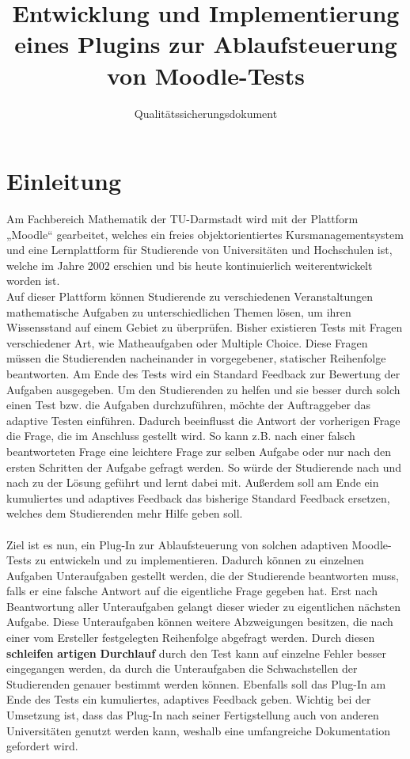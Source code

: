 \documentclass[accentcolor=tud0b,12pt,paper=a4]{tudreport}
\title{Entwicklung und Implementierung eines Plugins zur Ablaufsteuerung von Moodle-Tests}
\subtitle{Qualitätssicherungsdokument}
\begin{document}
	\maketitle
	\tableofcontents 
	
	\chapter{Einleitung}
Am Fachbereich Mathematik der TU-Darmstadt wird mit der Plattform „Moodle“ gearbeitet, welches ein freies objektorientiertes Kursmanagementsystem und eine Lernplattform für Studierende von Universitäten und Hochschulen ist, welche im Jahre 2002 erschien und bis heute kontinuierlich weiterentwickelt worden ist. 
\\
Auf dieser Plattform können Studierende zu verschiedenen Veranstaltungen mathematische Aufgaben zu unterschiedlichen Themen lösen, um ihren Wissensstand auf einem Gebiet zu überprüfen. Bisher existieren Tests mit Fragen verschiedener Art, wie Matheaufgaben oder Multiple Choice. Diese Fragen müssen die Studierenden nacheinander in vorgegebener, statischer Reihenfolge beantworten. Am Ende des Tests wird ein Standard Feedback zur Bewertung der Aufgaben ausgegeben. 
Um den Studierenden zu helfen und sie besser durch solch einen Test bzw. die Aufgaben durchzuführen, möchte der Auftraggeber das adaptive Testen einführen. Dadurch beeinflusst die Antwort der vorherigen Frage die Frage, die im Anschluss gestellt wird. So kann z.B. nach einer falsch beantworteten Frage eine leichtere Frage zur selben Aufgabe oder nur nach den ersten Schritten der Aufgabe gefragt werden. So würde  der Studierende nach und nach zu der Lösung geführt und lernt dabei mit. Außerdem soll am Ende ein kumuliertes und adaptives Feedback das bisherige Standard Feedback ersetzen, welches dem Studierenden mehr Hilfe geben soll.
\\
\\
Ziel ist es nun, ein Plug-In zur Ablaufsteuerung von solchen adaptiven Moodle-Tests zu entwickeln und zu implementieren. Dadurch können zu einzelnen Aufgaben Unteraufgaben gestellt werden, die der Studierende beantworten muss, falls er eine falsche Antwort auf die eigentliche Frage gegeben hat. Erst nach Beantwortung aller Unteraufgaben gelangt dieser wieder zu eigentlichen nächsten Aufgabe. Diese Unteraufgaben können weitere Abzweigungen besitzen, die nach einer vom Ersteller festgelegten Reihenfolge abgefragt werden. Durch diesen \textbf{schleifen} \textbf{artigen} \textbf{Durchlauf} durch den Test kann auf einzelne Fehler besser eingegangen werden, da durch die Unteraufgaben die Schwachstellen der Studierenden genauer bestimmt werden können. Ebenfalls soll das Plug-In am Ende des Tests ein kumuliertes, adaptives Feedback geben. Wichtig bei der Umsetzung ist, dass das Plug-In nach seiner Fertigstellung auch von anderen Universitäten genutzt werden kann, weshalb eine umfangreiche Dokumentation gefordert wird.
\end{document}
